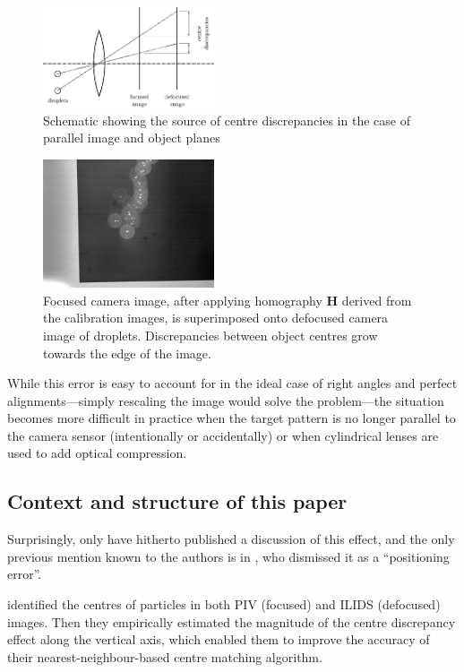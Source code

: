 \documentclass[floatfix,aip,rsi,reprint,graphicx]{revtex4-1}
\begin{document}
\begin{figure}
\centering
\includegraphics[width=0.45\textwidth]{orb_images/discrepancy.eps}
\caption{Schematic showing the source of centre discrepancies in the case of
parallel image and object planes \label{fig:discrepancy}}
\end{figure}
\begin{figure}
    \centering
    \includegraphics[width=0.45\textwidth]{orb_images/drop-calibration-off.jpg}
    \caption{Focused camera image, after applying homography $\mathbf{H}$
        derived from the calibration images, is superimposed onto
    defocused camera image of droplets. Discrepancies between object centres
grow towards the edge of the image.}
    \label{fig:drop-calibration-off}
\end{figure}
While this error is easy to account for in the ideal case of right angles and
perfect alignments---simply rescaling the image would solve the problem---the
situation becomes more difficult in practice when the target pattern is no longer
parallel to the camera sensor (intentionally or accidentally) or when
cylindrical lenses are used to add optical compression.

\subsection{Context and structure of this paper}
Surprisingly, only \citet{Hardalupas10} have hitherto published a discussion of
this effect, and the only previous mention known to the authors is in
\citet{Kurosawa02}, who dismissed it as a ``positioning error''.

\citet{Hardalupas10} identified the
centres of particles in both PIV (focused) and ILIDS (defocused) images. Then
they empirically estimated the magnitude of the centre discrepancy effect along
the vertical axis, which enabled them to improve the accuracy of their
nearest-neighbour-based centre matching algorithm.
\end{document}
